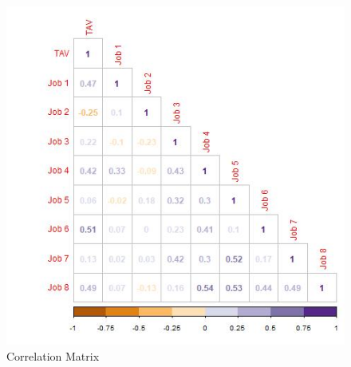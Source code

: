 \documentclass{article}
\begin{document}
\begin{figure}[H]
    \centering
    \includegraphics[width=.6\linewidth]{images/corr_matrix.jpeg}
    \caption{Correlation Matrix}
    \label{fig:corrMatrix}
\end{figure}
\end{document}
